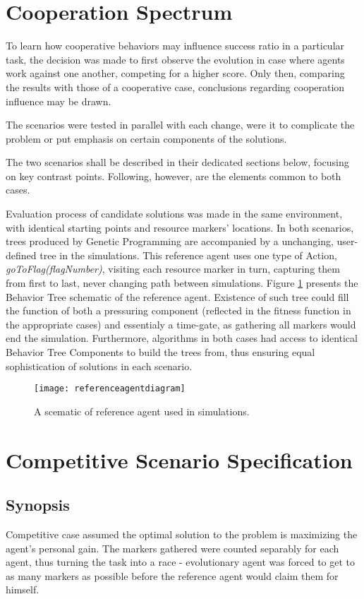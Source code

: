 \section{Cooperation Spectrum}
To learn how cooperative behaviors may influence success ratio in a particular task, the decision was made to first observe the evolution in case where agents work against one another, competing for a higher score. Only then, comparing the results with those of a cooperative case, conclusions regarding cooperation influence may be drawn.

The scenarios were tested in parallel with each change, were it to complicate the problem or put emphasis on certain components of the solutions.

The two scenarios shall be described in their dedicated sections below, focusing on key contrast points. Following, however, are the elements common to both cases.

Evaluation process of candidate solutions was made in the same environment, with identical starting points and resource markers' locations. In both scenarios, trees produced by Genetic Programming are accompanied by a unchanging, user-defined tree in the simulations. This reference agent uses one type of Action, \textit{goToFlag(flagNumber)}, visiting each resource marker in turn, capturing them from first to last, never changing path between simulations. Figure \ref{fig:x referenceagentdiagram} presents the Behavior Tree schematic of the reference agent. Existence of such tree could fill the function of both a pressuring component (reflected in the fitness function in the appropriate cases) and essentialy a time-gate, as gathering all markers would end the simulation. Furthermore, algorithms in both cases had access to identical Behavior Tree Components to build the trees from, thus ensuring equal sophistication of solutions in each scenario.

\begin{figure}[h]
    \centering
    \texttt{[image: referenceagentdiagram]}
    \caption{A scematic of reference agent used in simulations.}
    \label{fig:x referenceagentdiagram}
\end{figure}
\section{Competitive Scenario Specification}
\subsection{Synopsis}
Competitive case assumed the optimal solution to the problem is maximizing the agent's personal gain. The markers gathered were counted separably for each agent, thus turning the task into a race - evolutionary agent was forced to get to as many markers as possible before the reference agent would claim them for himself.

